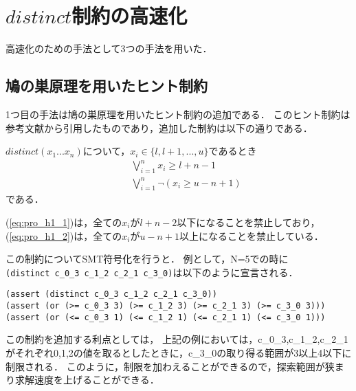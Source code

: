 \section{$distinct$制約の高速化}\label{sec:pro_hint}

高速化のための手法として3つの手法を用いた．

\subsection{鳩の巣原理を用いたヒント制約}\label{sec:pro_hint_1}
1つ目の手法は鳩の巣原理を用いたヒント制約の追加である．
このヒント制約は参考文献\cite{Tamura:queen}から引用したものであり，追加した制約は以下の通りである．

$distinct(x_1 ... x_n)$について，$x_i \in \{l, l+1, ..., u\}$であるとき
\begin{eqnarray}
&& \bigvee_{i=1}^n   x_i \geq l+n-1\\
\label{eq:pro_h1_1}
&& \bigvee_{i=1}^n \lnot(x_i \geq u-n+1)
\label{eq:pro_h1_2}
\end{eqnarray}
である．

(\ref{eq:pro_h1_1})は，全ての$x_i$が$l+n-2$以下になることを禁止しており，
(\ref{eq:pro_h1_2})は，全ての$x_i$が$u-n+1$以上になることを禁止している．

この制約についてSMT符号化を行うと．
例として，N=5での時に\\
\verb|(distinct c_0_3 c_1_2 c_2_1 c_3_0)|は以下のように宣言される．

{ \scriptsize \begin{verbatim}
(assert (distinct c_0_3 c_1_2 c_2_1 c_3_0))
(assert (or (>= c_0_3 3) (>= c_1_2 3) (>= c_2_1 3) (>= c_3_0 3)))
(assert (or (<= c_0_3 1) (<= c_1_2 1) (<= c_2_1 1) (<= c_3_0 1)))
\end{verbatim}}

この制約を追加する利点としては，
上記の例においては，c\_0\_3,c\_1\_2,c\_2\_1がそれぞれ0,1,2の値を取るとしたときに，c\_3\_0の取り得る範囲が3以上4以下に制限される．
このように，制限を加わえることができるので，探索範囲が狭まり求解速度を上げることができる．


